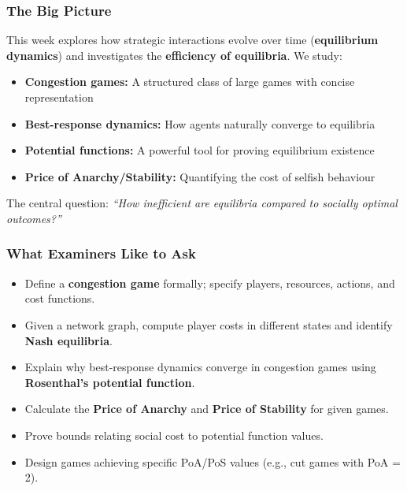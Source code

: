 \separator

\subsubsection*{The Big Picture}

This week explores how strategic interactions evolve over time (\textbf{equilibrium dynamics}) and investigates the \textbf{efficiency of equilibria}. We study:

\begin{itemize}
  \item \textbf{Congestion games:} A structured class of large games with concise representation
  \item \textbf{Best-response dynamics:} How agents naturally converge to equilibria
  \item \textbf{Potential functions:} A powerful tool for proving equilibrium existence
  \item \textbf{Price of Anarchy/Stability:} Quantifying the cost of selfish behaviour
\end{itemize}

The central question: \textit{``How inefficient are equilibria compared to socially optimal outcomes?''}

\separator

\subsubsection*{What Examiners Like to Ask}

\begin{itemize}
  \item Define a \textbf{congestion game} formally; specify players, resources, actions, and cost functions.
  \item Given a network graph, compute player costs in different states and identify \textbf{Nash equilibria}.
  \item Explain why best-response dynamics converge in congestion games using \textbf{Rosenthal's potential function}.
  \item Calculate the \textbf{Price of Anarchy} and \textbf{Price of Stability} for given games.
  \item Prove bounds relating social cost to potential function values.
  \item Design games achieving specific PoA/PoS values (e.g., cut games with PoA = 2).
\end{itemize}

\separator

